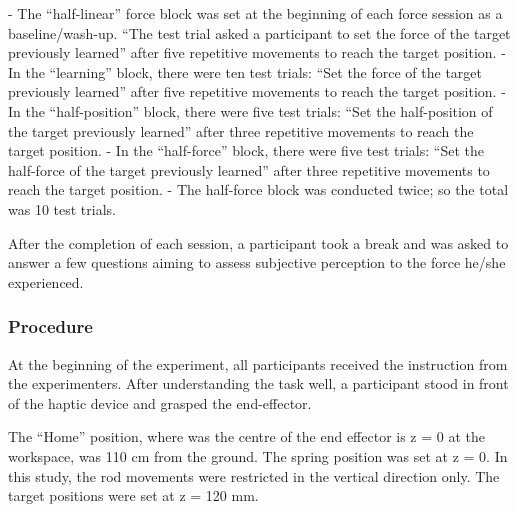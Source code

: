 -	The “half-linear” force block was set at the beginning of each force session as a baseline/wash-up. “The test trial asked a participant to set the force of the target previously learned” after five repetitive movements to reach the target position.
-	In the “learning” block, there were ten test trials: “Set the force of the target previously learned” after five repetitive movements to reach the target position.
-	In the “half-position” block, there were five test trials: “Set the half-position of the target previously learned” after three repetitive movements to reach the target position.
-	In the “half-force” block, there were five test trials: “Set the half-force of the target previously learned” after three repetitive movements to reach the target position.
-	The half-force block was conducted twice; so the total was 10 test trials.

After the completion of each session, a participant took a break and was asked to answer a few questions aiming to assess subjective perception to the force he/she experienced.

\subsubsection{Procedure}
At the beginning of the experiment, all participants received the instruction from the experimenters. After understanding the task well, a participant stood in front of the haptic device and grasped the end-effector.

The “Home” position, where was the centre of the end effector is z = 0 at the workspace, was 110 cm from the ground. The spring position was set at z = 0. In this study, the rod movements were restricted in the vertical direction only. The target positions were set at z = 120 mm.

